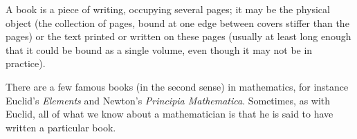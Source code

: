 A book is a piece of writing, occupying several pages; it may be the physical object (the collection of pages, bound at one edge between covers stiffer than the pages) or the text printed or written on these pages (usually at least long enough that it could be bound as a single volume, even though it may not be in practice).
\par
There are a few famous books (in the second sense) in mathematics, for instance Euclid's \emph{Elements}
and Newton's \emph{Principia Mathematica}. Sometimes, as with Euclid, all of what we know about a mathematician is that he is said to have written a particular book.